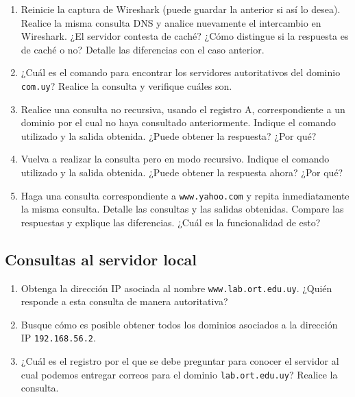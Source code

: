\documentclass[a4paper,10pt]{article}
\begin{document}
\begin{enumerate}
    \item Reinicie la captura de Wireshark (puede guardar la anterior si así lo desea). Realice la misma consulta DNS y analice nuevamente el intercambio en Wireshark. ¿El servidor contesta de caché? ¿Cómo distingue si la respuesta es de caché o no? Detalle las diferencias con el caso anterior.
    
    \item ¿Cuál es el comando para encontrar los servidores autoritativos del dominio \texttt{com.uy}? Realice la consulta y verifique cuáles son.
    
    \item Realice una consulta no recursiva, usando el registro A, correspondiente a un dominio por el cual no haya consultado anteriormente. Indique el comando utilizado y la salida obtenida. ¿Puede obtener la respuesta? ¿Por qué? 
    \item Vuelva a realizar la consulta pero en modo recursivo. Indique el comando utilizado y la salida obtenida. ¿Puede obtener la respuesta ahora? ¿Por qué? 
    \item Haga una consulta correspondiente a \texttt{www.yahoo.com} y repita inmediatamente la misma consulta. Detalle las consultas y las salidas obtenidas. Compare las respuestas y explique las diferencias. ¿Cuál es la funcionalidad de esto?
    \end{enumerate}

\subsection*{Consultas al servidor local}

    \begin{enumerate}
    \item Obtenga la dirección IP asociada al nombre \texttt{www.lab.ort.edu.uy}. ¿Quién responde a esta consulta de manera autoritativa?
    
    \item Busque cómo es posible obtener todos los dominios asociados a la dirección IP \texttt{192.168.56.2}.
    
    \item ¿Cuál es el  registro por el que se debe preguntar para conocer el servidor al cual podemos entregar correos para el dominio \texttt{lab.ort.edu.uy}? Realice la consulta.
    
\end{enumerate}

\newpage
\end{document}
